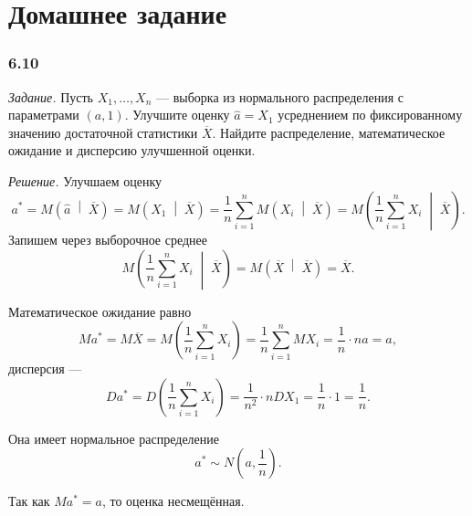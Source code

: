 \section*{Домашнее задание}

\subsubsection*{6.10}

\textit{Задание.}
Пусть $X_1, \dotsc, X_n$ ---
выборка из нормального распределения с параметрами $ \left( a, 1 \right) $.
Улучшите оценку $ \hat{a} = X_1$ усреднением по фиксированному значению достаточной
статистики $ \overline{X}$.
Найдите распределение, математическое ожидание и дисперсию улучшенной оценки.

\textit{Решение.} Улучшаем оценку
$$a^* =
  M \left( \hat{a} \; \middle| \; \overline{X} \right) =
  M \left( X_1 \; \middle| \; \overline{X} \right) =
  \frac{1}{n} \sum \limits_{i = 1}^n M \left( X_i \; \middle| \; \overline{X} \right) =
  M \left( \frac{1}{n} \sum \limits_{i = 1}^n X_i \; \middle| \; \overline{X} \right).$$
Запишем через выборочное среднее
$$M \left( \frac{1}{n} \sum \limits_{i = 1}^n X_i \; \middle| \; \overline{X} \right) =
  M \left( \overline{X} \; \middle| \; \overline{X} \right) =
  \overline{X}.$$

Математическое ожидание равно
$$Ma^* =
  M \overline{X} =
  M \left( \frac{1}{n} \sum \limits_{i = 1}^n X_i \right) =
  \frac{1}{n} \sum \limits_{i = 1}^n MX_i =
  \frac{1}{n} \cdot na =
  a,$$
дисперсия ---
$$Da^* =
  D \left( \frac{1}{n} \sum \limits_{i = 1}^n X_i \right) =
  \frac{1}{n^2} \cdot n DX_1 =
  \frac{1}{n} \cdot 1 =
  \frac{1}{n}.$$

Она имеет нормальное распределение
$$a^* \sim
  N \left( a, \frac{1}{n} \right).$$

Так как $Ma^* = a$, то оценка несмещённая.
